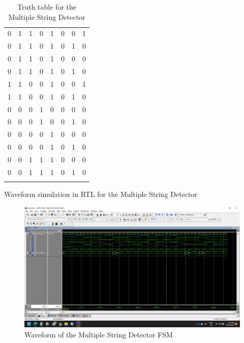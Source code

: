 \documentclass[12pt]{article}
\begin{document}
\begin{longtable}{|c|c|c|c|c|c|c|c|}
		0&1&1&0&1&0&0&1\\
		0&1&1&0&1&0&1&0\\
		0&1&1&0&1&0&0&0\\
		0&1&1&0&1&0&1&0\\
		1&1&0&0&1&0&0&1\\
		1&1&0&0&1&0&1&0\\
		0&0&0&1&0&0&0&0\\
		0&0&0&1&0&0&1&0\\
		0&0&0&0&1&0&0&0\\
		0&0&0&0&1&0&1&0\\
		0&0&1&1&1&0&0&0\\
		0&0&1&1&1&0&1&0\\




		
		\hline	%
		\caption{Truth table for the Multiple String Detector}
		\label{table:strdet_truth}
	\end{longtable}
	
	
	Waveform simulation in RTL for the Multiple String Detector
	\begin{figure}[H]
	  \centering
	  \includegraphics[width=\textwidth]{figs/strdet_waveform.PNG}  %
	  \caption{Waveform of the Multiple String Detector FSM}
	  \label{fig:strdet_waveform}
	  
	\end{figure}
	
\end{document}
